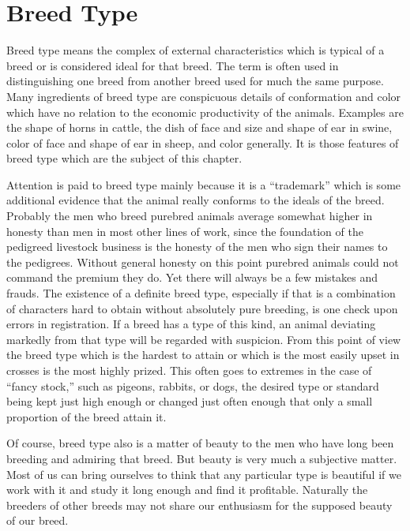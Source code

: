\chapter{Breed Type}
\label{cha:Lush_Chapter_18}

Breed type means the complex of external characteristics which is
typical of a breed or is considered ideal for that breed. The term is often
used in distinguishing one breed from another breed used for much the
same purpose. Many ingredients of breed type are conspicuous details
of conformation and color which have no relation to the economic productivity
of the animals. Examples are the shape of horns in cattle, the
dish of face and size and shape of ear in swine, color of face and shape
of ear in sheep, and color generally. It is those features of breed type
which are the subject of this chapter.

Attention is paid to breed type mainly because it is a ``trademark''
which is some additional evidence that the animal really conforms to
the ideals of the breed. Probably the men who breed purebred animals
average somewhat higher in honesty than men in most other lines of
work, since the foundation of the pedigreed livestock business is the
honesty of the men who sign their names to the pedigrees. Without
general honesty on this point purebred animals could not command the
premium they do. Yet there will always be a few mistakes and frauds.
The existence of a definite breed type, especially if that is a combination
of characters hard to obtain without absolutely pure breeding, is
one check upon errors in registration. If a breed has a type of this kind,
an animal deviating markedly from that type will be regarded with suspicion.
From this point of view the breed type which is the hardest to
attain or which is the most easily upset in crosses is the most highly
prized. This often goes to extremes in the case of ``fancy stock,'' such as
pigeons, rabbits, or dogs, the desired type or standard being kept just
high enough or changed just often enough that only a small proportion
of the breed attain it.

Of course, breed type also is a matter of beauty to the men who have
long been breeding and admiring that breed. But beauty is very much
a subjective matter. Most of us can bring ourselves to think that any
particular type is beautiful if we work with it and study it long enough
and find it profitable. Naturally the breeders of other breeds may not
share our enthusiasm for the supposed beauty of our breed.

